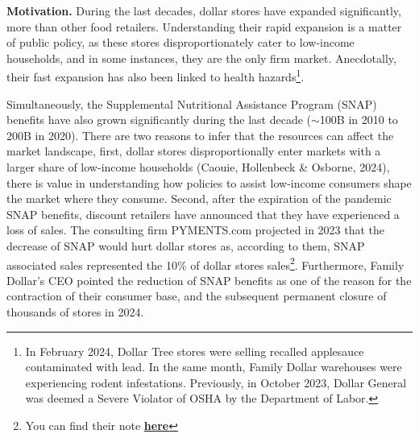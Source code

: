 \documentclass[11pt]{article}
\begin{document}
\textbf{Motivation.} During the last decades, dollar stores have expanded significantly, more than other food retailers. Understanding their rapid expansion is a matter of public policy, as these stores disproportionately cater to low-income households, and in some instances, they are the only firm market. Anecdotally, their fast expansion has also been linked to health hazards\footnote{In February 2024, Dollar Tree stores were selling recalled applesauce contaminated with lead. In the same month, Family Dollar warehouses were experiencing rodent infestations. Previously, in October 2023, Dollar General was deemed a Severe Violator of OSHA by the Department of Labor.}. 




Simultaneously, the Supplemental Nutritional Assistance Program (SNAP) benefits have also grown significantly during the last decade ($\sim$100B in 2010 to 200B in 2020). There are two reasons to infer that the resources can affect the market landscape, first, dollar stores disproportionally enter markets with a larger share of low-income households (Caouie, Hollenbeck \& Osborne, 2024), there is value in understanding how policies to assist low-income consumers shape the market where they consume. Second, after the expiration of the pandemic SNAP benefits, discount retailers have announced that they have experienced a loss of sales. The consulting firm PYMENTS.com projected in 2023 that the decrease of SNAP would hurt dollar stores as, according to them, SNAP associated sales represented the 10\% of dollar stores sales\footnote{You can find their note \href{https://www.pymnts.com/economy/2023/loss-of-snap-and-grocery-inflation-push-consumers-off-hunger-cliff/}{\textbf{here}}}. Furthermore, Family Dollar's CEO pointed the reduction of SNAP benefits as one of the reason for the contraction of their consumer base, and the subsequent permanent closure of thousands of stores in 2024. 
\end{document}
